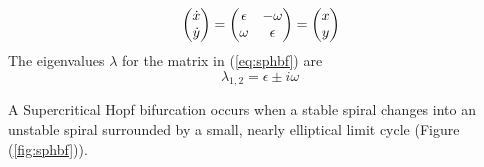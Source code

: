 \begin{equation}{\label{eq:sphbf}}
	\begin{pmatrix}
		\dot{x}\\\dot{y}
	\end{pmatrix}=
	\begin{pmatrix}
		\epsilon&-\omega\\
		\omega&\epsilon
	\end{pmatrix}=
	\begin{pmatrix}
		x\\y
	\end{pmatrix}
\end{equation}
The eigenvalues $\lambda$ for the matrix in (\ref{eq:sphbf}) are
\begin{equation}
	\lambda_{1,2}=\epsilon\pm i\omega
\end{equation}
\begin{comment}
	\begin{figure}[h!]
	\centering
	\begin{subfigure}{0.45\linewidth}
	\centering
	\texttt{[image: sphbf.png]}
	\caption{Supercritical Hopf bifurcation}
	\label{fig:sphbf}
	\end{subfigure}
	\vline
	\begin{subfigure}{0.354\linewidth}
	\centering
	\texttt{[image: sbhbf.png]}
	\caption{Subcritical Hopf bifurcation}
	\label{fig:sbhbf}
	\end{subfigure}
	\end{figure}
\end{comment}
A Supercritical Hopf bifurcation occurs when a stable spiral changes into an unstable spiral surrounded by a small, nearly elliptical limit cycle (Figure (\ref{fig:sphbf})).

